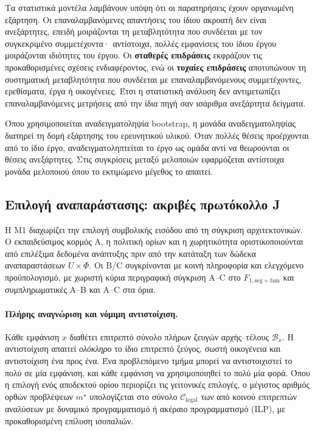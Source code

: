 \documentclass[11pt,a4paper]{article}
\begin{document}
Τα στατιστικά μοντέλα λαμβάνουν υπόψη ότι οι παρατηρήσεις έχουν οργανωμένη εξάρτηση. Οι επαναλαμβανόμενες απαντήσεις του ίδιου ακροατή δεν είναι ανεξάρτητες, επειδή μοιράζονται τη μεταβλητότητα που συνδέεται με τον συγκεκριμένο συμμετέχοντα· αντίστοιχα, πολλές εμφανίσεις του ίδιου έργου μοιράζονται ιδιότητες του έργου. Οι \textbf{σταθερές επιδράσεις} εκφράζουν τις προκαθορισμένες σχέσεις ενδιαφέροντος, ενώ οι \textbf{τυχαίες επιδράσεις} αποτυπώνουν τη συστηματική μεταβλητότητα που συνδέεται με επαναλαμβανόμενους συμμετέχοντες, ερεθίσματα, έργα ή οικογένειες. Έτσι η στατιστική ανάλυση δεν αντιμετωπίζει επαναλαμβανόμενες μετρήσεις από την ίδια πηγή σαν ισάριθμα ανεξάρτητα δείγματα.

Όπου χρησιμοποιείται αναδειγματοληψία bootstrap, η μονάδα αναδειγματοληψίας διατηρεί τη δομή εξάρτησης του ερευνητικού υλικού. Όταν πολλές θέσεις προέρχονται από το ίδιο έργο, αναδειγματοληπτείται το έργο ως ομάδα αντί να θεωρούνται οι θέσεις ανεξάρτητες. Στις συγκρίσεις μεταξύ μελοποιών εφαρμόζεται αντίστοιχα μονάδα μελοποιού όπου το εκτιμώμενο μέγεθος το απαιτεί.

\subsection{Επιλογή αναπαράστασης: ακριβές πρωτόκολλο J}\label{app:stats-selection}

Η Μ1 διαχωρίζει την επιλογή συμβολικής εισόδου από τη σύγκριση αρχιτεκτονικών. Ο εκπαιδεύσιμος κορμός A, η πολιτική ορίων και η χωρητικότητα οριστικοποιούνται από επιλέξιμα δεδομένα ανάπτυξης πριν από την κατάταξη των δώδεκα αναπαραστάσεων $U\times\Phi$. Οι B/C συγκρίνονται με κοινή πληροφορία και ελεγχόμενο προϋπολογισμό, με χωριστή κύρια περιγραφική σύγκριση A--C στο $F_{1,\mathrm{seg+fam}}$ και συμπληρωματικές A--B και A--C στα όρια.

\paragraph{Πλήρης αναγνώριση και νόμιμη αντιστοίχιση.}
Κάθε εμφάνιση $x$ διαθέτει επιτρεπτό σύνολο πλήρων ζευγών αρχής--τέλους $\mathcal B_x$. Η αντιστοίχιση απαιτεί \emph{ολόκληρο} το ίδιο επιτρεπτό ζεύγος, σωστή οικογένεια και αντιστοίχιση ένα προς ένα. Ένα προβλεπόμενο τμήμα μπορεί να αντιστοιχιστεί το πολύ σε μία εμφάνιση, και κάθε εμφάνιση να χρησιμοποιηθεί το πολύ μία φορά. Όπου η επιλογή ενός αποδεκτού ορίου περιορίζει τις γειτονικές επιλογές, ο μέγιστος αριθμός ορθών προβλέψεων $m^\star$ υπολογίζεται στο σύνολο $\mathcal C_{\mathrm{legal}}$ των από κοινού επιτρεπτών αναλύσεων με δυναμικό προγραμματισμό ή ακέραιο προγραμματισμό (ILP), με προκαθορισμένη επίλυση ισοπαλιών.
\end{document}
